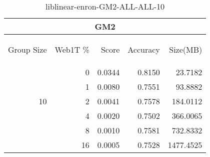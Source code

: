 \begin{center}
\begin{table}[htbp] 
 \begin{center}
\begin{tabular}{ | r | r | r | r | r |}
\hline
\multicolumn{5}{|c|}{GM2}\\
\hline
\begin{sideways}Group Size\end{sideways} & \begin{sideways}Web1T \%\end{sideways} & \begin{sideways}Score\end{sideways} & \begin{sideways}Accuracy\end{sideways} & \begin{sideways}Size(MB)\end{sideways}\\
\hline
\multirow{5}{*}{10}
 & 0 & 0.0344 & 0.8150 & 23.7182\\ \cline{2-5}
 & 1 & 0.0080 & 0.7551 & 93.8882\\ \cline{2-5}
 & 2 & 0.0041 & 0.7578 & 184.0112\\ \cline{2-5}
 & 4 & 0.0020 & 0.7502 & 366.0065\\ \cline{2-5}
 & 8 & 0.0010 & 0.7581 & 732.8332\\ \cline{2-5}
 & 16 & 0.0005 & 0.7528 & 1477.4525\\ \cline{2-5}
\hline
\end{tabular}
\caption{liblinear-enron-GM2-ALL-ALL-10}
\label{table:liblinear-enron-GM2-ALL-ALL-10}
\end{center}
 \end{table}
\end{center}

